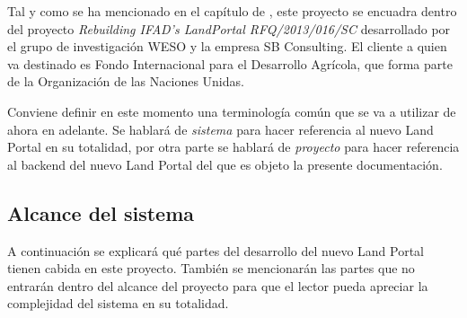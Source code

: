 Tal y como se ha mencionado en el capítulo de , este proyecto se encuadra dentro del proyecto \textit{Rebuilding IFAD's LandPortal RFQ/2013/016/SC} desarrollado por el grupo de investigación WESO y la empresa SB Consulting. El cliente a quien va destinado es Fondo Internacional para el Desarrollo Agrícola, que forma parte de la Organización de las Naciones Unidas.

Conviene definir en este momento una terminología común que se va a utilizar de ahora en adelante.  Se hablará de \textit{sistema} para hacer referencia al nuevo Land Portal en su totalidad, por otra parte se hablará de \textit{proyecto} para hacer referencia al backend del nuevo Land Portal del que es objeto la presente documentación.


\subsection{Alcance del sistema}
A continuación se explicará qué partes del desarrollo del nuevo Land Portal tienen cabida en este proyecto.  También se mencionarán las partes que no entrarán dentro del alcance del proyecto para que el lector pueda apreciar la complejidad del sistema en su totalidad.

